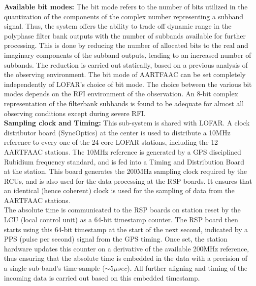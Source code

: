 \documentclass{ws-jai}
\begin{document}
\noindent \textbf  {Available bit modes:} The  bit mode refers to  the number of
bits  utilized in  the  quantization of  the components  of  the complex  number
representing a subband signal.  Thus, the system offers the ability to trade off
dynamic range in  the polyphase filter bank outputs with  the number of subbands
available  for further  processing.   This is  done by  reducing  the number  of
allocated bits  to the  real and  imaginary components  of the  subband outputs,
leading  to an  increased  number of  subbands.  The  reduction  is carried  out
statically, based on a previous analysis  of the observing environment.  The bit
mode of  AARTFAAC can be set  completely independently of LOFAR's  choice of bit
mode. The choice between the various bit modes depends on the RFI environment of
the observation.  An 8-bit complex  representation of the filterbank subbands is
found to  be adequate for almost  all observing conditions except  during severe
RFI.\\


\noindent \textbf  {Sampling clock and  Timing:} This sub-system is  shared with
LOFAR. A  clock distributor board (SyncOptics) at the center  is used to
distribute  a 10MHz  reference  to every  one  of the  24  core LOFAR  stations,
including the 12  AARTFAAC stations.  The 10MHz reference is  generated by a GPS
disciplined  Rubidium  frequency   standard,  and  is  fed  into   a  Timing  and
Distribution  Board at  the station.  This board  generates the  200MHz sampling
clock required by the RCUs, and is also  used for the data processing at the RSP
boards. It  ensures that  an identical  (hence coherent) clock  is used  for the
sampling of data from the AARTFAAC stations.\\

The absolute time is communicated to the  RSP boards on station reset by the LCU
(local control  unit) as a 64-bit  timestamp counter. The RSP  board then starts
using this 64-bit timestamp at the start  of the next second, indicated by a PPS
(pulse per second)  signal from the GPS timing.  Once  set, the station hardware
updates  this counter  on a  derivative of  the available  200MHz reference,  thus
ensuring that the  absolute time is embedded  in the data with a  precision of a
single sub-band's time-sample ($\sim5\mu sec$). All  further aligning and timing of
the incoming data is carried out based on this embedded timestamp.\\
\end{document}

